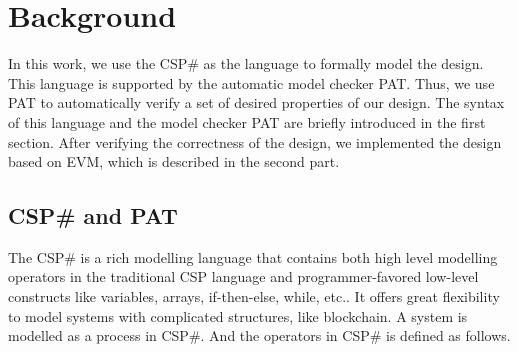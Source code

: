 \documentclass{KERauth}
\begin{document}
\section{Background}

In this work,
we use the CSP\# as the language to formally model the design.
This language is supported by the automatic model checker PAT. Thus, we use PAT to automatically verify a set of desired properties of our design. The syntax of this language and the model checker PAT are briefly introduced in the first section. After verifying the correctness of the design, we implemented the design based on EVM, which is described in the second part.

\subsection{CSP\# and PAT}

The CSP\# is a rich modelling language that contains both high level modelling operators in the traditional CSP language and programmer-favored low-level constructs like variables, arrays, if-then-else, while, etc..  It offers great flexibility to model systems with complicated structures, like blockchain. A system is modelled as a process in CSP\#. And the operators in CSP\# is defined as follows.
\end{document}
